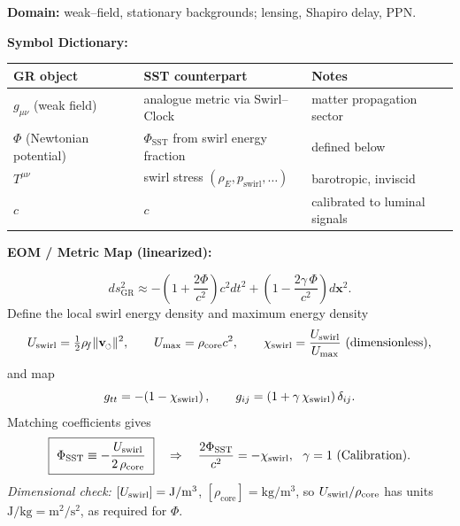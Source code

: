 \documentclass[11pt]{article}
\newcommand{\swirlarrow}{%
	\mathchoice{\mkern-2mu\scriptstyle\boldsymbol{\circlearrowleft}}%
	{\mkern-2mu\scriptstyle\boldsymbol{\circlearrowleft}}%
	{\mkern-2mu\scriptscriptstyle\boldsymbol{\circlearrowleft}}%
	{\mkern-2mu\scriptscriptstyle\boldsymbol{\circlearrowleft}}%
}
\newcommand{\vswirl}{\mathbf{v}_{\swirlarrow}}
\newcommand{\rhoF}{\rho_{\!f}}                           %
\newcommand{\rhoE}{\rho_{\!E}}                           %
\providecommand{\cLight}{c}
\begin{document}
    \begin{tcolorbox}[title=Rosetta Card: GR/PPN/GW $\to$ Swirl–String Theory (SST)]
        \small
        \textbf{Domain:} weak–field, stationary backgrounds; lensing, Shapiro delay, PPN.
        \begin{center}
            \textbf{Symbol Dictionary:}\\
        \end{center}

        \begin{tabular}{@{}lll@{}}
            \toprule
            GR object & SST counterpart & Notes \\
            \midrule
            $g_{\mu\nu}$ (weak field) & analogue metric via Swirl–Clock & matter propagation sector \\
            $\Phi$ (Newtonian potential) & $\Phi_{\text{SST}}$ from swirl energy fraction & defined below \\
            $T^{\mu\nu}$ & swirl stress $(\rhoE,p_{\text{swirl}},\ldots)$ & barotropic, inviscid \\
            $c$ & $\cLight$ & calibrated to luminal signals \\
            \bottomrule
        \end{tabular}
        \begin{center}
            \textbf{EOM / Metric Map (linearized):}
        \end{center}
        \[
            ds^2_{\text{GR}} \approx -\left(1+\frac{2\Phi}{\cLight^2}\right)\cLight^2 dt^2
            +\left(1-\frac{2\gamma\,\Phi}{\cLight^2}\right)d\mathbf{x}^2 .
        \]
        Define the local swirl energy density and maximum energy density
        \[
            \Uloc = \tfrac{1}{2}\rhoF \lVert \vswirl\rVert^2,\qquad
            \Umax = \rho_{\text{core}}\cLight^2,\qquad
            \chiS = \frac{\Uloc}{\Umax}\ (\text{dimensionless}),
        \]
        and map
        \[
            g_{tt} = -\!\left(1-\chi_{\text{swirl}}\right),\qquad
            g_{ij} = \left(1+\gamma\,\chi_{\text{swirl}}\right)\delta_{ij}.
        \]
        Matching coefficients gives
        \[
            \boxed{\ \Phi_{\text{SST}} \equiv -\frac{\Uloc}{2\,\rho_{\text{core}}}\ } \quad\Rightarrow\quad
            \frac{2\Phi_{\text{SST}}}{\cLight^2} = -\chiS,\ \ \gamma=1\ (\text{Calibration}).
        \]
        \emph{Dimensional check:} $[U_{\text{swirl}}]=\mathrm{J/m^3}$, $[\rho_{\text{core}}]=\mathrm{kg/m^3}$, so
        $U_{\text{swirl}}/\rho_{\text{core}}$ has units $\mathrm{J/kg}=\mathrm{m^2/s^2}$, as required for $\Phi$.


\end{tcolorbox}
\end{document}

